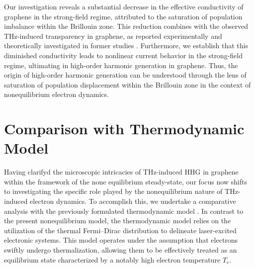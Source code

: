 Our investigation reveals a substantial decrease in the effective conductivity of graphene in the strong-field regime, attributed to the saturation of population imbalance within the Brillouin zone. This reduction combines with the observed THz-induced transparency in graphene, as reported experimentally \cite{Hwang2013, Paul_2013, doi:10.1063/1.4902999} and theoretically investigated in former studies \cite{sato2021nonlinear}. Furthermore, we establish that this diminished conductivity leads to nonlinear current behavior in the strong-field regime, ultimating in high-order harmonic generation in graphene. Thus, the origin of high-order harmonic generation can be understood through the lens of saturation of population displacement within the Brillouin zone in the context of nonequilibrium electron dynamics.
\section{Comparison with Thermodynamic Model \label{sec:thermo}}
Having clarifyd the microscopic intricacies of THz-induced \gls{HHG} in graphene within the framework of the none equilibrium steady-state, our focus now shifts to investigating the specific role played by the nonequilibrium nature of THz-induced electron dynamics. To accomplish this, we undertake a comparative analysis with the previously formulated thermodynamic model \cite{mics2015thermodynamic}. In contrast to the present nonequilibrium model, the thermodynamic model relies on the utilization of the thermal Fermi--Dirac distribution to delineate laser-excited electronic systems. This model operates under the assumption that electrons swiftly undergo thermalization, allowing them to be effectively treated as an equilibrium state characterized by a notably high electron temperature $T_e$.

